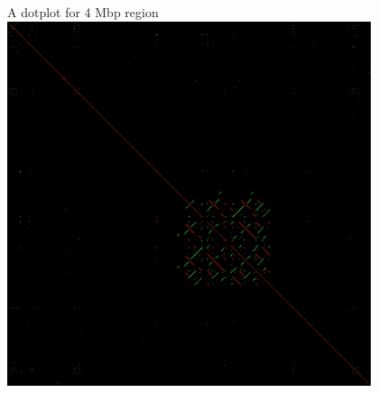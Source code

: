 \documentclass[pdf]{beamer}
\begin{document}
\begin{frame}{A dotplot for 4 Mbp region}
  \flushleft
    \includegraphics[width=0.8\textwidth]{images/mega_dotter_4_044000001.jpg}
    \hfill
\end{frame}
\end{document}
